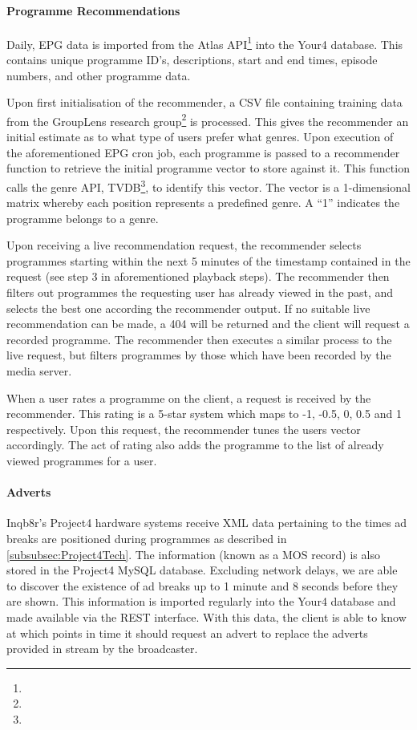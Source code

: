 \paragraph{Programme Recommendations}

Daily, EPG data is imported from the Atlas API\footnote{} into the Your4 database. This contains unique programme ID's, descriptions, start and end times, episode numbers, and other programme data.

Upon first initialisation of the recommender, a CSV file containing training data from the GroupLens research group\footnote{} is processed. This gives the recommender an initial estimate as to what type of users prefer what genres. Upon execution of the aforementioned EPG cron job, each programme is passed to a recommender function to retrieve the initial programme vector to store against it. This function calls the genre API, TVDB\footnote{}, to identify this vector. The vector is a 1-dimensional matrix whereby each position represents a predefined genre. A ``1'' indicates the programme belongs to a genre.

Upon receiving a live recommendation request, the recommender selects programmes starting within the next 5 minutes of the timestamp contained in the request (see step 3 in aforementioned playback steps). The recommender then filters out programmes the requesting user has already viewed in the past, and selects the best one according the recommender output. If no suitable live recommendation can be made, a 404 will be returned and the client will request a recorded programme. The recommender then executes a similar process to the live request, but filters programmes by those which have been recorded by the media server.

When a user rates a programme on the client, a request is received by the recommender. This rating is a 5-star system which maps to -1, -0.5, 0, 0.5 and 1 respectively. Upon this request, the recommender tunes the users vector accordingly. The act of rating also adds the programme to the list of already viewed programmes for a user.

\paragraph{Adverts}

Inqb8r's Project4 hardware systems receive XML data pertaining to the times ad breaks are positioned during programmes as described in \ref{subsubsec:Project4Tech}. The information (known as a MOS record) is also stored in the Project4 MySQL database. Excluding network delays, we are able to discover the existence of ad breaks up to 1 minute and 8 seconds before they are shown. This information is imported regularly into the Your4 database and made available via the REST interface. With this data, the client is able to know at which points in time it should request an advert to replace the adverts provided in stream by the broadcaster.

